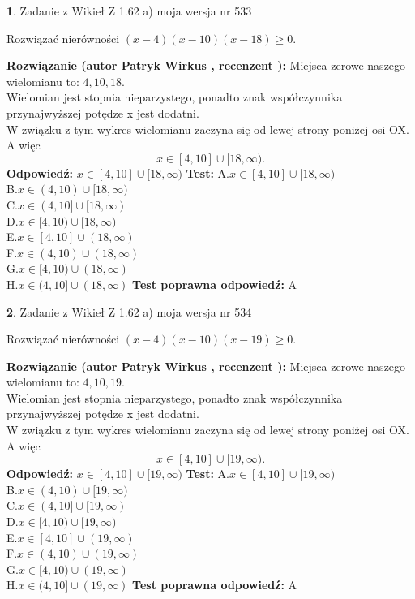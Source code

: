 \documentclass[12pt, a4paper]{article}
\theoremstyle{definition} %
\newtheorem{zad}{}
\newcommand{\zadStart}[1]{\begin{zad}#1\newline}
\newcommand{\zadStop}{\end{zad}}
\newcommand{\rozwStart}[2]{\noindent \textbf{Rozwiązanie (autor #1 , recenzent #2): }\newline}
\newcommand{\rozwStop}{\newline}
\newcommand{\odpStart}{\noindent \textbf{Odpowiedź:}\newline}
\newcommand{\odpStop}{\newline}
\newcommand{\testStart}{\noindent \textbf{Test:}\newline}
\newcommand{\testStop}{\newline}
\newcommand{\kluczStart}{\noindent \textbf{Test poprawna odpowiedź:}\newline}
\newcommand{\kluczStop}{\newline}
\begin{document}
\zadStart{Zadanie z Wikieł Z 1.62 a) moja wersja nr 533}

Rozwiązać nierówności $(x-4)(x-10)(x-18)\ge0$.
\zadStop
\rozwStart{Patryk Wirkus}{}
Miejsca zerowe naszego wielomianu to: $4, 10, 18$.\\
Wielomian jest stopnia nieparzystego, ponadto znak współczynnika przy\linebreak najwyższej potędze x jest dodatni.\\ W związku z tym wykres wielomianu zaczyna się od lewej strony poniżej osi OX. A więc $$x \in [4,10] \cup [18,\infty).$$
\rozwStop
\odpStart
$x \in [4,10] \cup [18,\infty)$
\odpStop
\testStart
A.$x \in [4,10] \cup [18,\infty)$\\
B.$x \in (4,10) \cup [18,\infty)$\\
C.$x \in (4,10] \cup [18,\infty)$\\
D.$x \in [4,10) \cup [18,\infty)$\\
E.$x \in [4,10] \cup (18,\infty)$\\
F.$x \in (4,10) \cup (18,\infty)$\\
G.$x \in [4,10) \cup (18,\infty)$\\
H.$x \in (4,10] \cup (18,\infty)$
\testStop
\kluczStart
A
\kluczStop



\zadStart{Zadanie z Wikieł Z 1.62 a) moja wersja nr 534}

Rozwiązać nierówności $(x-4)(x-10)(x-19)\ge0$.
\zadStop
\rozwStart{Patryk Wirkus}{}
Miejsca zerowe naszego wielomianu to: $4, 10, 19$.\\
Wielomian jest stopnia nieparzystego, ponadto znak współczynnika przy\linebreak najwyższej potędze x jest dodatni.\\ W związku z tym wykres wielomianu zaczyna się od lewej strony poniżej osi OX. A więc $$x \in [4,10] \cup [19,\infty).$$
\rozwStop
\odpStart
$x \in [4,10] \cup [19,\infty)$
\odpStop
\testStart
A.$x \in [4,10] \cup [19,\infty)$\\
B.$x \in (4,10) \cup [19,\infty)$\\
C.$x \in (4,10] \cup [19,\infty)$\\
D.$x \in [4,10) \cup [19,\infty)$\\
E.$x \in [4,10] \cup (19,\infty)$\\
F.$x \in (4,10) \cup (19,\infty)$\\
G.$x \in [4,10) \cup (19,\infty)$\\
H.$x \in (4,10] \cup (19,\infty)$
\testStop
\kluczStart
A
\kluczStop
\end{document}
